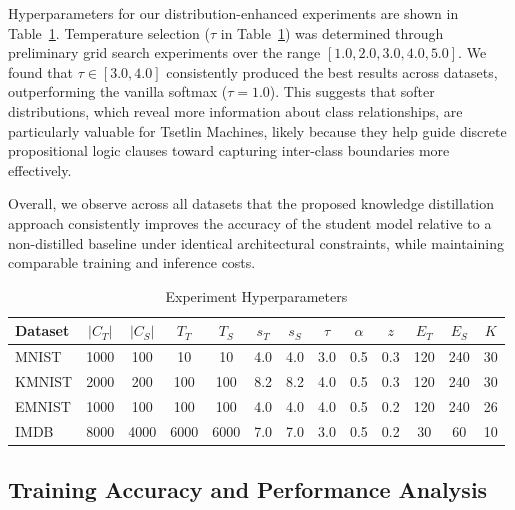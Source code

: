 \documentclass[sn-mathphys-num]{sn-jnl}%
\theoremstyle{thmstyleone}%
\theoremstyle{thmstyletwo}%
\theoremstyle{thmstylethree}%
\begin{document}
Hyperparameters for our distribution-enhanced experiments are shown in Table~\ref{tab:hyperparams-dkd}. Temperature selection ($\tau$ in Table~\ref{tab:hyperparams-dkd}) was determined through preliminary grid search experiments over the range $[1.0, 2.0, 3.0, 4.0, 5.0]$. We found that $\tau \in [3.0, 4.0]$ consistently produced the best results across datasets, outperforming the vanilla softmax ($\tau = 1.0$). This suggests that softer distributions, which reveal more information about class relationships, are particularly valuable for Tsetlin Machines, likely because they help guide discrete propositional logic clauses toward capturing inter-class boundaries more effectively. 

Overall, we observe across all datasets that the proposed knowledge distillation approach consistently improves the accuracy of the student model relative to a non-distilled baseline under identical architectural constraints, while maintaining comparable training and inference costs.

\begin{table}
	\centering
	\caption{Experiment Hyperparameters }
	\label{tab:hyperparams-dkd}
	\begin{tabular}{|l|c|c|c|c|c|c|c|c|c|c|c|c|}
	\hline
	Dataset & $|C_T|$ & $|C_S|$ & $T_T$ & $T_S$ & $s_T$ & $s_S$ & $\tau$ & $\alpha$ & $z$ & $E_T$ & $E_S$ & $K$ \\
	\hline
	MNIST & 1000 & 100 & 10 & 10 & 4.0 & 4.0 & 3.0 & 0.5 & 0.3 & 120 & 240 & 30 \\\hline
	KMNIST & 2000 & 200 & 100 & 100 & 8.2 & 8.2 & 4.0 & 0.5 & 0.3 & 120 & 240 & 30 \\\hline
	EMNIST & 1000 & 100 & 100 & 100 & 4.0 & 4.0 & 4.0 & 0.5 & 0.2 & 120 & 240 & 26 \\\hline
	IMDB & 8000 & 4000 & 6000 & 6000 & 7.0 & 7.0 & 3.0 & 0.5 & 0.2 & 30 & 60 & 10 \\\hline
	\end{tabular}
	\label{tab:hyperparams-dkd}
\end{table}

\subsection{Training Accuracy and Performance Analysis} \label{sec:trapa}
\end{document}

